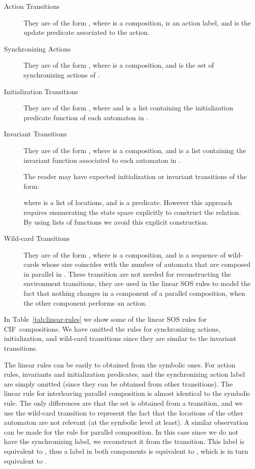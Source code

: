 \documentclass[submission,copyright,creativecommons,sharealike]{eptcs}
\newcommand{\CIF}{{CIF}}
\begin{document}
\begin{description}
\item[Action Transitions] They are of the form
,
where  is a composition,  is
an action label, and  is the update predicate
associated to the action.
\item[Synchronizing Actions] They are of the form
,
where  is a composition, and  is the set of synchronizing actions of .
\item[Initialization Transitions] They are of the form , where  and  is a list containing the
  initialization predicate function of each automaton in .
\item[Invariant Transitions] They are of the form ,
  where  is a composition, and  is a list containing the
  invariant function associated to each automaton in .

  The reader may have expected initialization or invariant
    transitions of the form:
  
  where  is a list of locations, and  is a predicate.
  However this approach requires enumerating the state space
  explicitly to construct the  relation. By using lists of
  functions we avoid this explicit construction.
\item[Wild-card Transitions] They are of the form ,
  where  is a composition, and 
  is a sequence of wild-cards whose size coincides with the number of
  automata that are composed in parallel in . These transition are
  not needed for reconstructing the environment transitions, they are
  used in the linear SOS rules to model the fact that nothing changes
  in a component of a parallel composition, when the other component
  performs an action.
\end{description}



In Table~\ref{tab:linear-rules} we show some of the linear SOS rules for
\CIF\ compositions. We have omitted the rules for synchronizing
actions, initialization, and wild-card transitions since they are
similar to the invariant transitions.

The linear rules can be easily to obtained from the symbolic
  ones. For action rules, invariants and initialization predicates,
and the synchronizing action label are simply omitted (since they can
be obtained from other transitions). The linear rule for
interleaving parallel composition is almost identical to the symbolic
rule. The only differences are that the set  is obtained from a
 transition, and we use the wild-card transition to represent
the fact that the locations of the other automaton are not relevant
(at the symbolic level at least).
A similar observation can be made for the rule for parallel
composition. In this case since we do not have the synchronizing
label, we reconstruct it from the  transition. This label is
equivalent to , thus a label  in both components
is equivalent to , which is in turn equivalent
to .
\end{document}
